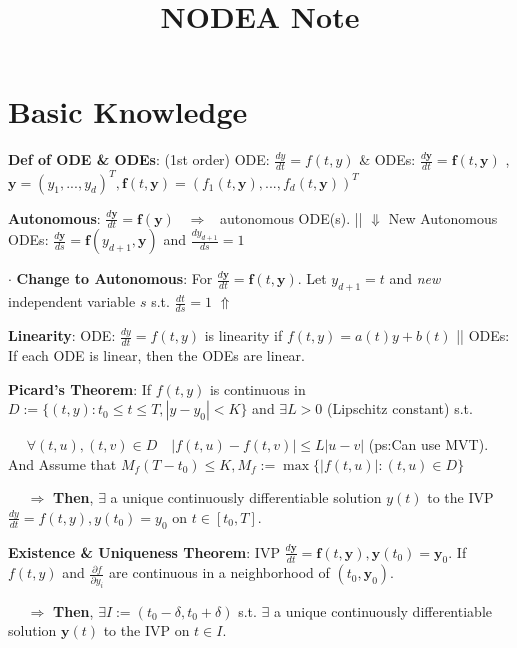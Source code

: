 \documentclass[9pt]{article}
\title{NODEA Note}
\author{}
\date{}
\begin{document}
\maketitle
\thispagestyle{fancy}
\vspace{-3.5cm}

\fontsize{10pt}{11pt}\selectfont
\setlength{\parindent}{8pt}


\section{Basic Knowledge} %

\textbf{Def of ODE \& ODEs}: {\scriptsize (1st order)} ODE: $\frac{dy}{dt}=f(t,y)$ \quad \& \quad ODEs: $\frac{d\mathbf{y}}{dt}=\mathbf{f}(t,\mathbf{y})$ , {\footnotesize $\mathbf{y}=(y_1,...,y_d)^T,\mathbf{f}(t,\mathbf{y})=(f_1(t,\mathbf{y}),...,f_d(t,\mathbf{y}))^T$}

\textbf{Autonomous}: $\frac{d\mathbf{y}}{dt}=\mathbf{f}(\mathbf{y})$ \ $\Rightarrow$ \ autonomous ODE(s). \quad \quad \quad || $\Downarrow$ New Autonomous ODEs: $\frac{d\mathbf{y}}{ds}=\mathbf{f}(y_{d+1},\mathbf{y})$ and $\frac{dy_{d+1}}{ds}=1$

$\cdot$ \textbf{Change to Autonomous}: For $\frac{d\mathbf{y}}{dt}=\mathbf{f}(t,\mathbf{y})$. Let $y_{d+1}=t$ and \textit{new} independent variable $s$ s.t. $\frac{dt}{ds}=1$ $\Uparrow$

\textbf{Linearity}: ODE: $\frac{dy}{dt}=f(t,y)$ is linearity if $f(t,y)=a(t)y+b(t)$ \quad || ODEs: {\small If each ODE is linear, then the ODEs are linear.}

\textbf{Picard's Theorem}: If $f(t,y)$ is continuous in $D:=\{(t,y):t_0\leq t\leq T,|y-y_0|<K\}$ and $\exists L>0$ {\footnotesize (Lipschitz constant)} s.t.

$\quad$ $\forall (t,u),(t,v)\in D \quad|f(t,u)-f(t,v)|\leq L|u-v|$ {\tiny (ps:Can use MVT)}. And Assume that $M_f(T-t_0)\leq K,M_f:=\max\{|f(t,u)|:(t,u)\in D\}$

$\quad$ $\Rightarrow$ \textbf{Then}, $\exists$ a unique continuously differentiable solution $y(t)$ to the IVP $\frac{dy}{dt}=f(t,y),y(t_0)=y_0$ on $t\in[t_0,T]$.

\textbf{Existence \& Uniqueness Theorem}: IVP $\frac{d\mathbf{y}}{dt}=\mathbf{f}(t,\mathbf{y}),\mathbf{y}(t_0)=\mathbf{y}_0$. If $f(t,y)$ and $\frac{\partial f}{\partial y_i}$ are continuous in a neighborhood of $(t_0,\mathbf{y}_0)$.

$\quad$ $\Rightarrow$ \textbf{Then}, $\exists I:=(t_0-\delta,t_0+\delta)$ s.t. $\exists$ a unique continuously differentiable solution $\mathbf{y}(t)$ to the IVP on $t\in I$.
\end{document}
